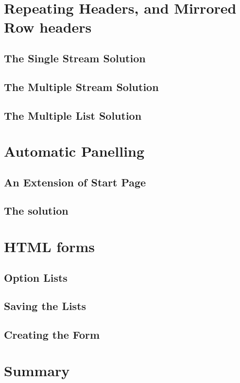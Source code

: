 \documentclass{book}
\begin{document}
\section{Repeating Headers, and Mirrored Row headers}

\subsection{The Single Stream Solution}

\subsection{The Multiple Stream Solution}

\subsection{The Multiple List Solution}

\section{Automatic Panelling}

\subsection{An Extension of Start Page}

\subsection{The solution}

\section{HTML forms}

\subsection{Option Lists}

\subsection{Saving the Lists}

\subsection{Creating the Form}

\section{Summary}
\end{document}
